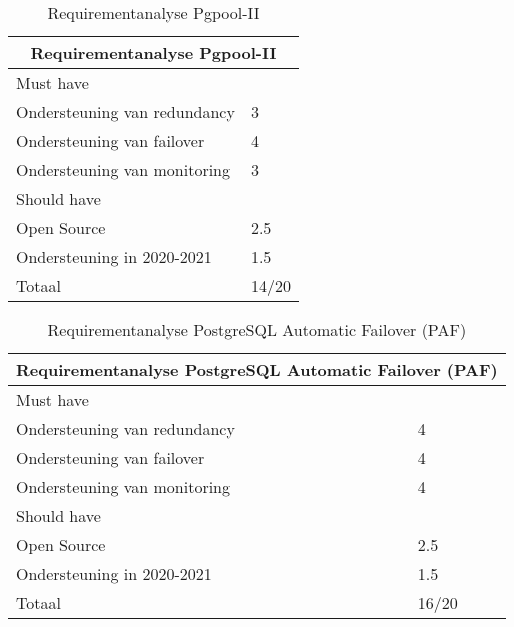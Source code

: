 \begin{table}[!h]
\begin{tabular}{ |p{6cm}||p{6cm}|  }
    \hline
    \multicolumn{2}{|c|}{Requirementanalyse Pgpool-II} \\
    \hline
    Must have & \\
    \hline
    Ondersteuning van redundancy  & 3 \\
    Ondersteuning van failover &  4 \\
    Ondersteuning van monitoring & 3 \\
    \hline
    Should have & \\
    \hline
    Open Source &  2.5 \\
    Ondersteuning in 2020-2021 & 1.5 \\
    \hline
    \hline
    Totaal & 14/20 \\
    \hline
\end{tabular}
\caption{Requirementanalyse Pgpool-II}
\label{table:Requirementanalyse Pgpool-II}
\end{table}

\begin{table}[!h]
\begin{tabular}{ |p{6cm}||p{6cm}|  }
    \hline
    \multicolumn{2}{|c|}{Requirementanalyse PostgreSQL Automatic Failover (PAF)} \\
    \hline
    Must have & \\
    \hline
    Ondersteuning van redundancy  & 4 \\
    Ondersteuning van failover &  4 \\
    Ondersteuning van monitoring & 4 \\
    \hline
    Should have & \\
    \hline
    Open Source &  2.5 \\
    Ondersteuning in 2020-2021 & 1.5 \\
    \hline
    \hline
    Totaal & 16/20 \\
    \hline    
\end{tabular}
\caption{Requirementanalyse PostgreSQL Automatic Failover (PAF)}
\label{table:Requirementanalyse PostgreSQL Automatic Failover (PAF)}
\end{table}


